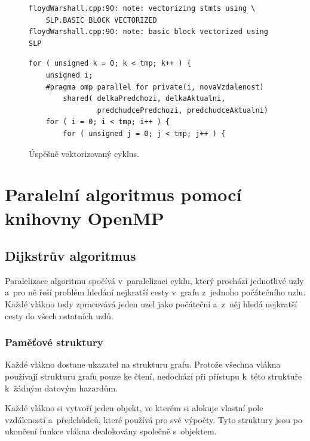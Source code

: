 \begin{figure}
    \centering
    \caption{Úspěšně vektorizovaný cyklus.}
	\label{f:fw:vect1}
    \begin{lstlisting}
floydWarshall.cpp:90: note: vectorizing stmts using \
    SLP.BASIC BLOCK VECTORIZED
floydWarshall.cpp:90: note: basic block vectorized using SLP
    \end{lstlisting}
    
	\begin{lstlisting}
for ( unsigned k = 0; k < tmp; k++ ) {
	unsigned i;
	#pragma omp parallel for private(i, novaVzdalenost)
        shared( delkaPredchozi, delkaAktualni,
                predchudcePredchozi, predchudceAktualni)
	for ( i = 0; i < tmp; i++ ) {
		for ( unsigned j = 0; j < tmp; j++ ) {
	\end{lstlisting}
\end{figure}




\section{Paralelní algoritmus pomocí knihovny OpenMP}

\subsection{Dijkstrův algoritmus} \label{l:omp:dij}
Paralelizace algoritmu spočívá v~paralelizaci cyklu, který prochází jednotlivé uzly a~pro ně řeší problém hledání nejkratší cesty v~grafu z~jednoho po\-čá\-teč\-ní\-ho uzlu.
Každé vlákno tedy zpracovává jeden uzel jako počáteční a~z~něj hledá nejkratší cesty do všech ostatních uzlů.

\subsubsection{Paměťové struktury}
Každé vlákno dostane ukazatel na strukturu grafu. Protože všechna vlákna používají strukturu grafu pouze ke čtení, nedochází při přístupu k~této struktuře k~žádným datovým hazardům.

Každé vlákno si vytvoří jeden objekt, ve kterém si alokuje vlastní pole vzdáleností a~předchůdců, které používá pro své výpočty. Tyto struktury jsou po ukončení funkce vlákna dealokovány společně s~objektem.

